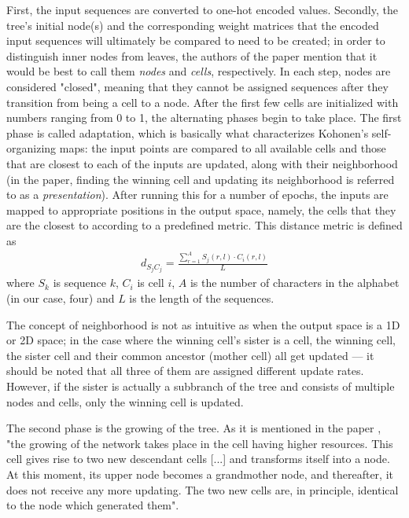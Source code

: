 \documentclass[11pt,twocolumn]{article}
\begin{document}
First, the input sequences are converted to one-hot encoded values. Secondly, the tree's initial node(s) and the corresponding weight matrices that the encoded input sequences will ultimately be compared to need to be created; in order to distinguish inner nodes from leaves, the authors of the paper mention that it would be best to call them \textit{nodes} and \textit{cells}, respectively. In each step, nodes are considered "closed", meaning that they cannot be assigned sequences after they transition from being a cell to a node. After the first few cells are initialized with numbers ranging from 0 to 1, the alternating phases begin to take place. The first phase is called adaptation, which is basically what characterizes Kohonen's self-organizing maps: the input points are compared to all available cells and those that are closest to each of the inputs are updated, along with their neighborhood (in the paper, finding the winning cell and updating its neighborhood is referred to as a \textit{presentation}). After running this for a number of epochs, the inputs are mapped to appropriate positions in the output space, namely, the cells that they are the closest to according to a predefined metric. This distance metric is defined as
\begin{align}
d_{S_j C_j} = \frac{\sum_{r = 1}^A S_j(r, l) \cdot C_i(r, l)}{L}
\end{align}
where $S_k$ is sequence $k$, $C_i$ is cell $i$, $A$ is the number of characters in the alphabet (in our case, four) and $L$ is the length of the sequences.

The concept of neighborhood is not as intuitive as when the output space is a 1D or 2D space; in the case where the winning cell's sister is a cell, the winning cell, the sister cell and their common ancestor (mother cell) all get updated — it should be noted that all three of them are assigned different update rates. However, if the sister is actually a subbranch of the tree and consists of multiple nodes and cells, only the winning cell is updated.

The second phase is the growing of the tree. As it is mentioned in the paper \cite{Dopazo1997}, "the growing of the network takes place in the cell having higher resources. This cell gives rise to two new descendant cells [...] and transforms itself into a node. At this moment, its upper node becomes a grandmother node, and thereafter, it does not receive any more updating. The two new cells are, in principle, identical to the node which generated them".
\end{document}
